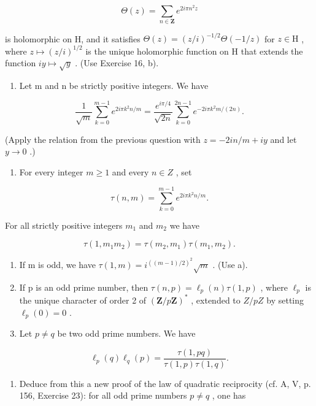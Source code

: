 \[
\Theta (z) = \sum_ {n \in \mathbf {Z}} e ^ {2 i \pi n ^ {2} z}
\]

is holomorphic on H, and it satisfies \(\Theta(z) = (z/i)^{-1/2}\Theta(-1/z)\) for \(z\in\mathrm{H}\) , where \(z\mapsto(z/i)^{1/2}\) is the unique holomorphic function on H that extends the function \(iy\mapsto\sqrt{y}\) . (Use Exercise 16, b).

\begin{enumerate}
\def\labelenumi{\alph{enumi})}
\setcounter{enumi}{1}
\tightlist
\item
  Let m and n be strictly positive integers. We have
\end{enumerate}

\[
\frac {1}{\sqrt {m}} \sum_ {k = 0} ^ {m - 1} e ^ {2 i \pi k ^ {2} n / m} = \frac {e ^ {i \pi / 4}}{\sqrt {2 n}} \sum_ {k = 0} ^ {2 n - 1} e ^ {- 2 i \pi k ^ {2} m / (2 n)}.
\]

(Apply the relation from the previous question with \(z = -2in / m + iy\) and let \(y \to 0\) .)

\begin{enumerate}
\def\labelenumi{\alph{enumi})}
\setcounter{enumi}{2}
\tightlist
\item
  For every integer \(m \geqslant 1\) and every \(n \in Z\) , set
\end{enumerate}

\[
\tau (n, m) = \sum_ {k = 0} ^ {m - 1} e ^ {2 i \pi k ^ {2} n / m}.
\]

For all strictly positive integers \(m_{1}\) and \(m_{2}\) we have

\[
\tau (1, m _ {1} m _ {2}) = \tau (m _ {2}, m _ {1}) \tau (m _ {1}, m _ {2}).
\]

\begin{enumerate}
\def\labelenumi{\alph{enumi})}
\setcounter{enumi}{3}
\item
  If m is odd, we have \(\tau(1,m)=i^{((m-1)/2)^{2}}\sqrt{m}\) . (Use a).
\item
  If p is an odd prime number, then \(\tau(n,p)=\ell_{p}(n)\tau(1,p)\) , where \(\ell_{p}\) is the unique character of order 2 of \((\mathbf{Z}/p\mathbf{Z})^{*}\) , extended to \(Z/pZ\) by setting \(\ell_{p}(0)=0\) .
\item
  Let \(p \neq q\) be two odd prime numbers. We have
\end{enumerate}

\[
\ell_ {p} (q) \ell_ {q} (p) = \frac {\tau (1 , p q)}{\tau (1 , p) \tau (1 , q)}.
\]

\begin{enumerate}
\def\labelenumi{\alph{enumi})}
\setcounter{enumi}{6}
\tightlist
\item
  Deduce from this a new proof of the law of quadratic reciprocity (cf. A, V, p. 156, Exercise 23): for all odd prime numbers \(p \neq q\) , one has
\end{enumerate}


